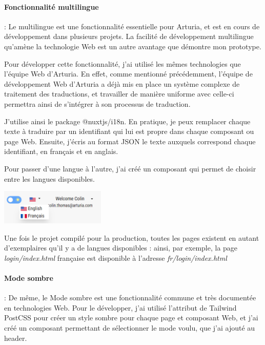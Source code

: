 \documentclass[francais]{rapportPFE}  %
\begin{document}
\paragraph{Fonctionnalité multilingue}: Le multilingue est une fonctionnalité essentielle pour Arturia, et est en cours de développement dans plusieurs projets. La facilité de développement multilingue qu'amène la technologie Web est un autre avantage que démontre mon prototype.

Pour développer cette fonctionnalité, j'ai utilisé les mêmes technologies que l'équipe Web d'Arturia. En effet, comme mentionné précédemment, l'équipe de développement Web d'Arturia a déjà mis en place un système complexe de traitement des traductions, et travailler de manière uniforme avec celle-ci permettra ainsi de s'intégrer à son processus de traduction. 

J'utilise ainsi le package @nuxtjs/i18n. En pratique, je peux remplacer chaque texte à traduire par un identifiant qui lui est propre dans chaque composant ou page Web. Ensuite, j'écris au format JSON le texte auxquels correspond chaque identifiant, en français et en anglais.

Pour passer d'une langue à l'autre, j'ai créé un composant qui permet de choisir entre les langues disponibles.

\begin{center}
	\centering
	\includegraphics[width=5cm]{graphics/languages.png}
	\begin{tiny}
	\end{tiny}
	\label{fig}
\end{center} 

Une fois le projet compilé pour la production, toutes les pages existent en autant d'exemplaires qu'il y a de langues disponibles : ainsi, par exemple, la page \textit{login/index.html} française est disponible à l'adresse \textit{fr/login/index.html}

\paragraph{Mode sombre}: De même, le Mode sombre est une fonctionnalité commune et très documentée en technologies Web. Pour le développer, j'ai utilisé l'attribut de Tailwind PostCSS pour créer un style sombre pour chaque page et composant Web, et j'ai créé un composant permettant de sélectionner le mode voulu, que j'ai ajouté au header. 
\end{document}
